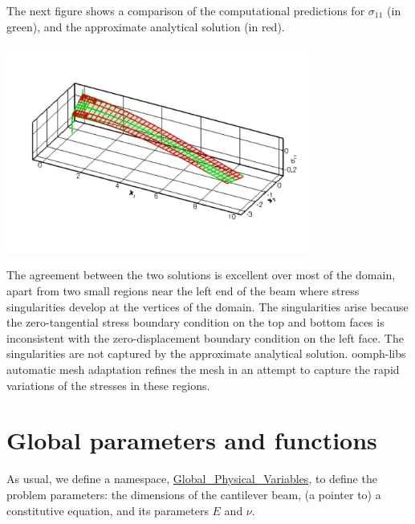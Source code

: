The next figure shows a comparison of the computational predictions for $ \sigma_{11} $ (in green), and the approximate analytical solution (in red).

 
\begin{DoxyImage}
\includegraphics[width=0.75\textwidth]{stress_comparison}
\end{DoxyImage}


The agreement between the two solutions is excellent over most of the domain, apart from two small regions near the left end of the beam where stress singularities develop at the vertices of the domain. The singularities arise because the zero-\/tangential stress boundary condition on the top and bottom faces is inconsistent with the zero-\/displacement boundary condition on the left face. The singularities are not captured by the approximate analytical solution. {\ttfamily oomph-\/lib\textquotesingle{}s} automatic mesh adaptation refines the mesh in an attempt to capture the rapid variations of the stresses in these regions.



 

\hypertarget{index_global}{}\section{Global parameters and functions}\label{index_global}
As usual, we define a namespace, {\ttfamily \hyperlink{namespaceGlobal__Physical__Variables}{Global\+\_\+\+Physical\+\_\+\+Variables}}, to define the problem parameters\+: the dimensions of the cantilever beam, (a pointer to) a constitutive equation, and its parameters $ E $ and $ \nu $.

